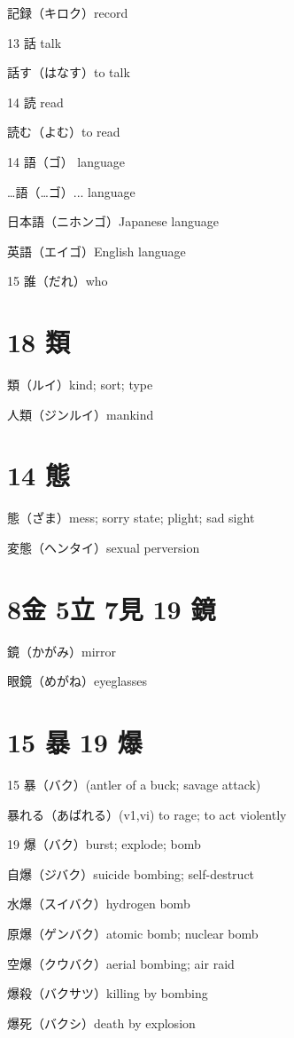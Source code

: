 記録（キロク）record

13 話 talk

話す（はなす）to talk

14 読 read

読む（よむ）to read

14 語（ゴ） language

…語（…ゴ）... language

日本語（ニホンゴ）Japanese language

英語（エイゴ）English language

15 誰（だれ）who

\section{18 類}

類（ルイ）kind; sort; type

人類（ジンルイ）mankind

\section{14 態}

態（ざま）mess; sorry state; plight; sad sight

変態（ヘンタイ）sexual perversion

\section{8金 5立 7見 19 鏡}

鏡（かがみ）mirror

眼鏡（めがね）eyeglasses

\section{15 暴 19 爆}

15 暴（バク）(antler of a buck; savage attack)

暴れる（あばれる）(v1,vi) to rage; to act violently

19 爆（バク）burst; explode; bomb

自爆（ジバク）suicide bombing; self-destruct

水爆（スイバク）hydrogen bomb

原爆（ゲンバク）atomic bomb; nuclear bomb

空爆（クウバク）aerial bombing; air raid

爆殺（バクサツ）killing by bombing

爆死（バクシ）death by explosion
